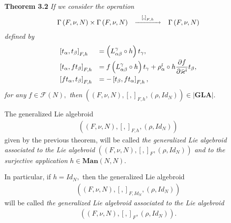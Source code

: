 \documentclass[11pt]{article}
\begin{document}
\textbf{Theorem 3.2} \emph{If we consider the operation }%
\begin{equation*}
\begin{array}{ccc}
\Gamma \left( F,\nu ,N\right) \times \Gamma \left( F,\nu ,N\right) & ^{%
\underrightarrow{~\ \ \left[ ,\right] _{F,h}~\ \ }} & \Gamma \left( F,\nu
,N\right)%
\end{array}%
\end{equation*}%
\emph{defined by}%
\begin{equation*}
\begin{array}{ll}
\left[ t_{\alpha },t_{\beta }\right] _{F,h} & =\left( L_{\alpha \beta
}^{\gamma }\circ h\right) t_{\gamma },\vspace*{1mm} \\
\left[ t_{\alpha },ft_{\beta }\right] _{F,h} & =f\left( L_{\alpha \beta
}^{\gamma }\circ h\right) t_{\gamma }+\rho _{\alpha }^{\tilde{\imath}}\circ h%
\displaystyle\frac{\partial f}{\partial \bar{\varkappa}^{\tilde{\imath}}}%
t_{\beta },\vspace*{1mm} \\
\left[ ft_{\alpha },t_{\beta }\right] _{F,h} & =-\left[ t_{\beta
},ft_{\alpha }\right] _{F,h},~%
\end{array}%
\end{equation*}%
\emph{for any }$f\in \mathcal{F}\left( N\right) ,$ \emph{then }$\left(
\left( F,\nu ,N\right) ,\left[ ,\right] _{F,h},\left( \rho ,Id_{N}\right)
\right) \in \left\vert \mathbf{GLA}\right\vert .$

The generalized Lie algebroid
\begin{equation*}
\begin{array}{c}
\left( \left( F,\nu ,N\right) ,\left[ ,\right] _{F,h},\left( \rho
,Id_{N}\right) \right)%
\end{array}%
\end{equation*}%
given by the previous theorem, will be called \emph{the generalized Lie
algebroid associated to the Lie algebroid }$\left( \left( F,\nu ,N\right) ,%
\left[ ,\right] _{F},\left( \rho ,Id_{N}\right) \right) $ \emph{and to the
surjective application }$h\in \mathbf{Man}\left( N,N\right) .$

In particular, if $h=Id_{N},$ then the generalized Lie algebroid
\begin{equation*}
\begin{array}{c}
\left( \left( F,\nu ,N\right) ,\left[ ,\right] _{F,Id_{N}},\left( \rho
,Id_{N}\right) \right)%
\end{array}%
\end{equation*}%
will be called \emph{the generalized Lie algebroid associated to the Lie
algebroid}%
\begin{equation*}
\begin{array}{c}
\left( \left( F,\nu ,N\right) ,\left[ ,\right] _{F},\left( \rho
,Id_{N}\right) \right) .%
\end{array}%
\end{equation*}
\end{document}
